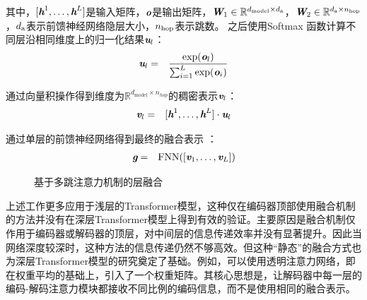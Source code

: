 \begin{itemize}
\noindent 其中，$[\textbf{\em h}^1,\ldots,\textbf{\em h}^L]$是输入矩阵，$\textbf{\em o}$是输出矩阵，$\textbf{\em W}_1 \in \mathbb{R}^{d_{\textrm{model}} \times d_{\rm a}}$，$\textbf{\em W}_2 \in \mathbb{R}^{d_{\rm a}\times n_{\rm hop}}$，$d_{\rm a}$表示前馈神经网络隐层大小，$n_{\rm hop}$表示跳数。 之后使用Softmax 函数计算不同层沿相同维度上的归一化结果$\textbf{\em u}_l$：
\begin{eqnarray}
\textbf{\em u}_l &=& \frac{\textrm{exp}(\textbf{\em o}_l)}{\sum_{i=1}^L{\textrm{exp}(\textbf{\em o}_i)}}
\label{eq:15-34}
\end{eqnarray}

\noindent 通过向量积操作得到维度为$\mathbb{R}^{d_{\textrm{model}} \times n_{hop}}$的稠密表示$\textbf{\em v}_l$：
\begin{eqnarray}
\textbf{\em v}_l & = & [\textbf{\em h}^1,\ldots,\textbf{\em h}^L]\cdot \textbf{\em u}_l 
\label{eq:15-35}
\end{eqnarray}

\noindent 通过单层的前馈神经网络得到最终的融合表示 ：
\begin{eqnarray}
\textbf{\em g} & = & \textrm{FNN}([\textbf{\em v}_1,\ldots,\textbf{\em v}_L]) 
\label{eq:15-36}
\end{eqnarray}

\vspace{0.5em}
\end{itemize}

\begin{figure}[htp]
\centering

\caption{基于多跳注意力机制的层融合}
\label{fig:15-11}
\end{figure}

\parinterval 上述工作更多应用于浅层的Transformer模型，这种仅在编码器顶部使用融合机制的方法并没有在深层Transformer模型上得到有效的验证。主要原因是融合机制仅作用于编码器或解码器的顶层，对中间层的信息传递效率并没有显著提升。因此当网络深度较深时，这种方法的信息传递仍然不够高效。但这种“静态”的融合方式也为深层Transformer模型的研究奠定了基础。例如，可以使用透明注意力网络，即在权重平均的基础上，引入了一个权重矩阵。其核心思想是，让解码器中每一层的编码-解码注意力模块都接收不同比例的编码信息，而不是使用相同的融合表示。


